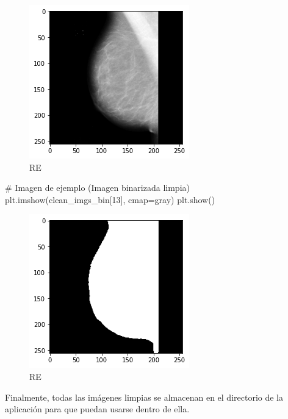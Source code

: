 \documentclass[
]{article}
\newenvironment{Shaded}{\begin{snugshade}}{\end{snugshade}}
\newcommand{\CommentTok}[1]{\textcolor[rgb]{0.54,0.53,0.53}{#1}}
\newcommand{\DecValTok}[1]{\textcolor[rgb]{0.69,0.50,0.00}{#1}}
\newcommand{\NormalTok}[1]{\textcolor[rgb]{0.12,0.11,0.11}{#1}}
\newcommand{\OperatorTok}[1]{\textcolor[rgb]{0.12,0.11,0.11}{#1}}
\newcommand{\StringTok}[1]{\textcolor[rgb]{0.75,0.01,0.01}{#1}}
\begin{document}
\begin{figure}
\centering
\includegraphics{img/tarea_2_4_1.png}
\caption{RE}
\end{figure}

\begin{Shaded}
\begin{Highlighting}[]
\CommentTok{\# Imagen de ejemplo (Imagen binarizada limpia)}
\NormalTok{plt.imshow(clean\_imgs\_bin[}\DecValTok{13}\NormalTok{], cmap}\OperatorTok{=}\StringTok{\textquotesingle{}gray\textquotesingle{}}\NormalTok{)}
\NormalTok{plt.show()}
\end{Highlighting}
\end{Shaded}

\begin{figure}
\centering
\includegraphics{img/tarea_2_4_2.png}
\caption{RE}
\end{figure}

Finalmente, todas las imágenes limpias se almacenan en el directorio de
la aplicación para que puedan usarse dentro de ella.
\end{document}
